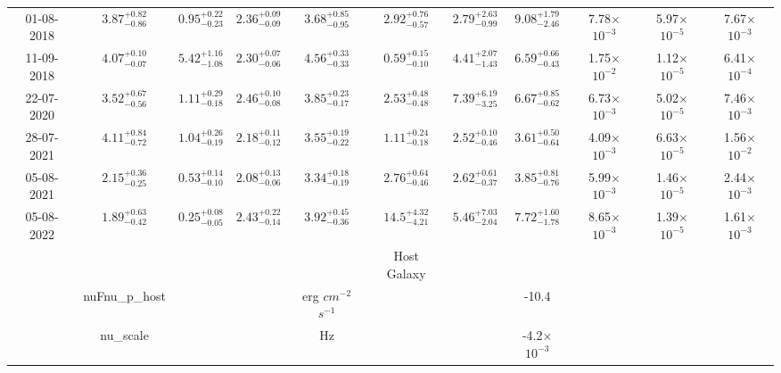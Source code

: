 \documentclass[11pt]{article}
\begin{document}
\begin{table}[htbp]
{\begin{tabular}{ccccccccccc}
             01-08-2018&   $3.87^{+0.82}_{-0.86}$&   $0.95^{+0.22}_{-0.23}$&   $2.36^{+0.09}_{-0.09}$&   $3.68^{+0.85}_{-0.95}$&   $2.92^{+0.76}_{-0.57}$&   $2.79^{+2.63}_{-0.99}$&   $9.08^{+1.79}_{-2.46}$& 7.78$\times$$10^{-3}$& 5.97$\times$$10^{-5}$ &7.67$\times$$10^{-3}$\\
             11-09-2018&   $4.07^{+0.10}_{-0.07}$&   $5.42^{+1.16}_{-1.08}$&   $2.30^{+0.07}_{-0.06}$&   $4.56^{+0.33}_{-0.33}$&   $0.59^{+0.15}_{-0.10}$&   $4.41^{+2.07}_{-1.43}$&   $6.59^{+0.66}_{-0.43}$& 1.75$\times$$10^{-2}$& 1.12$\times$$10^{-5}$& 6.41$\times$$10^{-4}$ \\
             22-07-2020&$3.52^{+0.67}_{-0.56}$&   $1.11^{+0.29}_{-0.18}$&$2.46^{+0.10}_{-0.08}$&   $3.85^{+0.23}_{-0.17}$&$2.53^{+0.48}_{-0.48}$&   $7.39^{+6.19}_{-3.25}$&$6.67^{+0.85}_{-0.62}$& 6.73$\times$$10^{-3}$&5.02$\times$$10^{-5}$& 7.46$\times$$10^{-3}$ \\
             28-07-2021&   $4.11^{+0.84}_{-0.72}$&   $1.04^{+0.26}_{-0.19}$&   $2.18^{+0.11}_{-0.12}$&   $3.55^{+0.19}_{-0.22}$&   $1.11^{+0.24}_{-0.18}$&   $2.52^{+0.10}_{-0.46}$&   $3.61^{+0.50}_{-0.64}$& 4.09$\times$$10^{-3}$& 6.63$\times$$10^{-5}$& 1.56$\times$$10^{-2}$ \\
             05-08-2021& $2.15^{+0.36}_{-0.25}$& $0.53^{+0.14}_{-0.10}$&   $2.08^{+0.13}_{-0.06}$&   $3.34^{+0.18}_{-0.19}$&   $2.76^{+0.64}_{-0.46}$&   $2.62^{+0.61}_{-0.37}$&   $3.85^{+0.81}_{-0.76}$& 5.99$\times$$10^{-3}$& 1.46$\times$$10^{-5}$ &2.44$\times$$10^{-3}$ \\
             05-08-2022& $1.89^{+0.63}_{-0.42}$& $0.25^{+0.08}_{-0.05}$&   $2.43^{+0.22}_{-0.14}$&   $3.92^{+0.45}_{-0.36}$&   $14.5^{+4.32}_{-4.21}$&   $5.46^{+7.03}_{-2.04}$&   $7.72^{+1.60}_{-1.78}$& 8.65$\times$$10^{-3}$& 1.39$\times$$10^{-5}$& 1.61$\times$$10^{-3}$ \\
             \hline
             \hline
             &   & &&& Host Galaxy &&    & &&\\
             \hline
             \hline
                &nuFnu\_p\_host & &   &erg $cm^{-2}$$s^{-1}$   &   &   &-10.4   &&& \\
               &nu\_scale &&    & Hz &   &    & -4.2$\times$$10^{-3}$ & &&\\
            \hline
            \hline
             
      \end{tabular}
}
\end{table}
\end{document}
